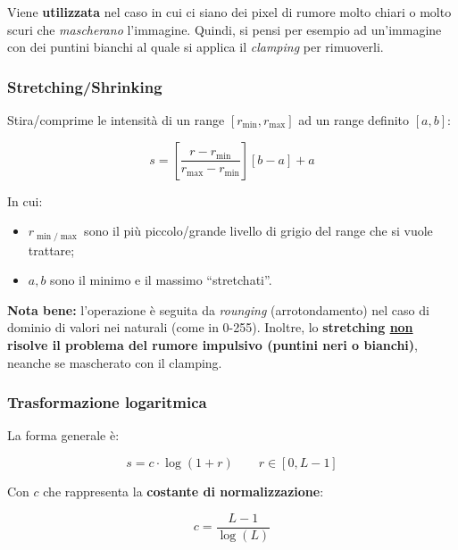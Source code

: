 \documentclass[a4paper]{article}
\newcommand{\dquotes}[1]{``#1''}
\begin{document}
	\noindent
	Viene \textbf{utilizzata} nel caso in cui ci siano dei pixel di rumore molto chiari o molto scuri che \emph{mascherano} l'immagine. Quindi, si pensi per esempio ad un'immagine con dei puntini bianchi al quale si applica il \emph{clamping} per rimuoverli.
	
	\subsubsection{Stretching/Shrinking}
	
	Stira/comprime le intensità di un range $\left[r_{\min}, r_{\max}\right]$ ad un range definito $\left[a,b\right]$:
	
	\begin{equation*}
		s = \left[\dfrac{r - r_{\min}}{r_{\max} - r_{\min}}\right] \left[b - a\right] + a
	\end{equation*}

	\noindent
	In cui:
	
	\begin{itemize}
		\item $r_{\min / \max}$ sono il più piccolo/grande livello di grigio del range che si vuole trattare;
		\item $a,b$ sono il minimo e il massimo \dquotes{stretchati}.
	\end{itemize}

	\noindent
	\textbf{Nota bene:} l'operazione è seguita da \emph{rounging} (arrotondamento) nel caso di dominio di valori nei naturali (come in 0-255). Inoltre, lo \textbf{stretching \underline{non} risolve il problema del rumore impulsivo (puntini neri o bianchi)}, neanche se mascherato con il clamping.
	
	\newpage
	
	\subsubsection{Trasformazione logaritmica}\label{trasformazione logaritmica}
	
	La forma generale è:
	
	\begin{equation*}
		s = c \cdot \log\left(1 + r\right) \hspace{2em} r \in \left[0, L - 1\right]
	\end{equation*}

	\noindent
	Con $c$ che rappresenta la \textbf{costante di normalizzazione}:
	
	\begin{equation*}
		c = \dfrac{L - 1}{\log\left(L\right)}
	\end{equation*}
	
\end{document}
